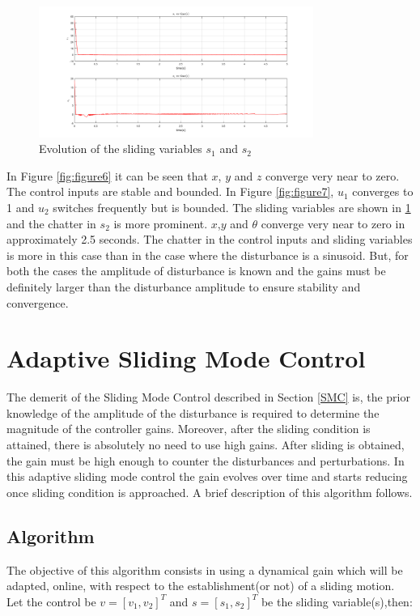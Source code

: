 \documentclass{article}
\begin{document}
\begin{itemize}
\begin{figure}[H]
\centering
\includegraphics[width = 0.8\textwidth]{Figures/figure8.png}
\caption{Evolution of the sliding variables $s_1$ and $s_2$}
\label{fig:figure8}
\end{figure}

In Figure \ref{fig:figure6} it can be seen that $x$, $y$ and $z$ converge very near to zero. The control inputs are stable and bounded. In Figure \ref{fig:figure7}, $u_1$ converges to 1 and $u_2$ switches frequently but is bounded. The sliding variables are shown in \ref{fig:figure8} and the chatter in $s_2$ is more prominent. $x$,$y$ and $\theta$ converge very near to zero in approximately 2.5 seconds. The chatter in the control inputs and sliding variables is more in this case than in the case where the disturbance is a sinusoid. But, for both the cases the amplitude of disturbance is known and the gains must be definitely larger than the disturbance amplitude to ensure stability and convergence.
\end{itemize}
\section{Adaptive Sliding Mode Control}
The demerit of the Sliding Mode Control described in Section \ref{SMC} is, the prior knowledge of the amplitude of the disturbance is required to determine the magnitude of the controller gains. Moreover, after the sliding condition is attained, there is absolutely no need to use high gains. After sliding is obtained, the gain must be high enough to counter the disturbances and perturbations. In this adaptive sliding mode control the gain evolves over time and starts reducing once sliding condition is approached. 
A brief description of this algorithm follows.
\subsection{Algorithm} 
The objective of this algorithm consists in using a dynamical gain which will be adapted, online, with respect to the establishment(or not) of a sliding motion. Let the control be $v=[v_1,v_2]^T$ and $s=[s_1,s_2]^T$ be the sliding variable(s),then:\\
\end{document}
